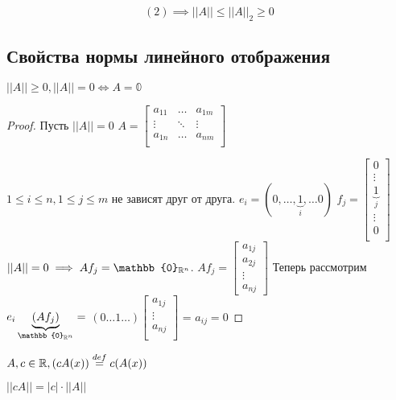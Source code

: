 \documentclass[main]{subfiles}
\begin{document}
\[(2) \implies ||A|| \leq ||A||_2 \geq 0\]

\subsection{Свойства нормы линейного отображения}
 \begin{theorem}$||A|| \geq 0, ||A|| = 0 \Leftrightarrow A = \mathbb{0}$ \end{theorem}
    \begin{proof}
        Пусть $||A|| = 0$ 
        $A = \begin{bmatrix}
            a_{11} & \ldots & a_{1m} \\
            \vdots & \ddots & \vdots \\
            a_{1n} & \ldots & a_{nm} \\
        \end{bmatrix}$
        
        $1 \leq i \leq n, 1 \leq j \leq m$ не зависят друг от друга.
        \newline
        $e_i = (0, \ldots, \underbrace{1}_i, \ldots 0)$
        $f_j = \begin{bmatrix}
            0 \\
            \vdots \\
            \underbrace{1}_j \\
            \vdots \\
            0 \\ \end{bmatrix}$
        \newline
        $||A|| = 0 \implies Af_j = \mathbb{0}_{{\vR}^n} $.
        $Af_j =
        \begin{bmatrix}
            a_{1j} \\
            a_{2j}\\
            \vdots \\
            a_{nj}
        \end{bmatrix} $
        Теперь рассмотрим $e_i \underbrace{(Af_j)}_{\mathbb{0}_{{\vR}^n}} =$
        $ (0 \ldots 1 \ldots) \begin{bmatrix}
            a_{1j} \\
            \vdots \\
            a_{nj} \\ \end{bmatrix}$ = $a_{ij} = 0$
    \end{proof}
    $A, c \in {\mathbb{R}}, (cA(x)) \stackrel{def}{=} c(A(x))$ 
    \begin{theorem}$||cA|| = |c| \cdot ||A||$ \end{theorem}
\end{document}
